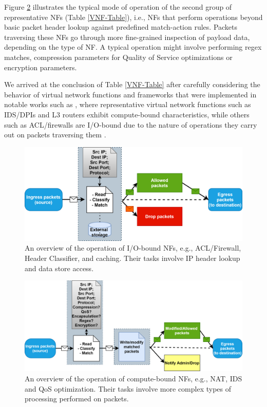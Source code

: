 \documentclass[conference]{IEEEtran}
\begin{document}
Figure \ref{DPI} illustrates the typical mode of operation of the second group of representative NFs (Table \ref{VNF-Table}), i.e., NFs that perform operations beyond basic packet header lookup against predefined match-action rules. Packets traversing these NFs go through more fine-grained inspection of payload data, depending on the type of NF. A typical operation might involve performing regex matches, compression parameters for Quality of Service optimizations or encryption parameters.

We arrived at the conclusion of Table \ref{VNF-Table} after carefully considering the behavior of virtual network functions and frameworks that were implemented in notable works such as \cite{kulkarni2018reinforce, perino2014caesar, adoga2022network, chen2022automatic}, where representative virtual network functions such as IDS/DPIs and L3 routers exhibit compute-bound characteristics, while others such as ACL/firewalls are I/O-bound due to the nature of operations they carry out on packets traversing them \cite{katsikas2018metron, bremler2016openbox}.

\begin{figure}[tb]
\centering
\includegraphics[width=\columnwidth]{FirewallNF.png}
\caption{An overview of the operation of I/O-bound NFs, e.g., ACL/Firewall, Header Classifier, and caching. Their tasks involve IP header lookup and data store access.}
\label{FirewallNF}
\end{figure}

\begin{figure}[tb]
\centering
\includegraphics[width=\columnwidth]{DPI.png}
\caption{An overview of the operation of compute-bound NFs, e.g., NAT, IDS and QoS optimization. Their tasks involve more complex types of processing performed on packets.}
\label{DPI}
\end{figure}
\end{document}
